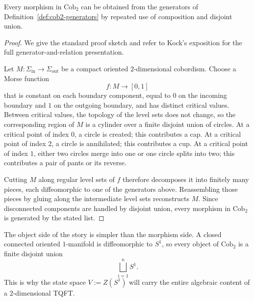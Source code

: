 \begin{proposition}\label{prop:cob2-generated}
Every morphism in $\mathrm{Cob}_2$ can be obtained from the generators of Definition~\ref{def:cob2-generators} by repeated use of composition and disjoint union.
\end{proposition}

\begin{proof}
We give the standard proof sketch and refer to Kock's exposition \cite[\S1.3]{Kock2004Frobenius} for the full generator-and-relation presentation.

\medskip

\noindent Let $M : \Sigma_{\mathrm{in}} \to \Sigma_{\mathrm{out}}$ be a compact oriented $2$-dimensional cobordism. Choose a Morse function
\begin{equation}\label{eq:morse-on-cobordism}
f : M \longrightarrow [0,1]
\end{equation}
that is constant on each boundary component, equal to $0$ on the incoming boundary and $1$ on the outgoing boundary, and has distinct critical values. Between critical values, the topology of the level sets does not change, so the corresponding region of $M$ is a cylinder over a finite disjoint union of circles. At a critical point of index $0$, a circle is created; this contributes a cap. At a critical point of index $2$, a circle is annihilated; this contributes a cup. At a critical point of index $1$, either two circles merge into one or one circle splits into two; this contributes a pair of pants or its reverse.

\medskip

\noindent Cutting $M$ along regular level sets of $f$ therefore decomposes it into finitely many pieces, each diffeomorphic to one of the generators above. Reassembling those pieces by gluing along the intermediate level sets reconstructs $M$. Since disconnected components are handled by disjoint union, every morphism in $\mathrm{Cob}_2$ is generated by the stated list.
\end{proof}

\begin{remark}\label{rem:closed-1-manifolds}
The object side of the story is simpler than the morphism side. A closed connected oriented $1$-manifold is diffeomorphic to $S^1$, so every object of $\mathrm{Cob}_2$ is a finite disjoint union
\begin{equation}\label{eq:object-union-circles}
\bigsqcup_{i=1}^n S^1.
\end{equation}
This is why the state space $V := Z(S^1)$ will carry the entire algebraic content of a 2-dimensional TQFT.
\end{remark}

